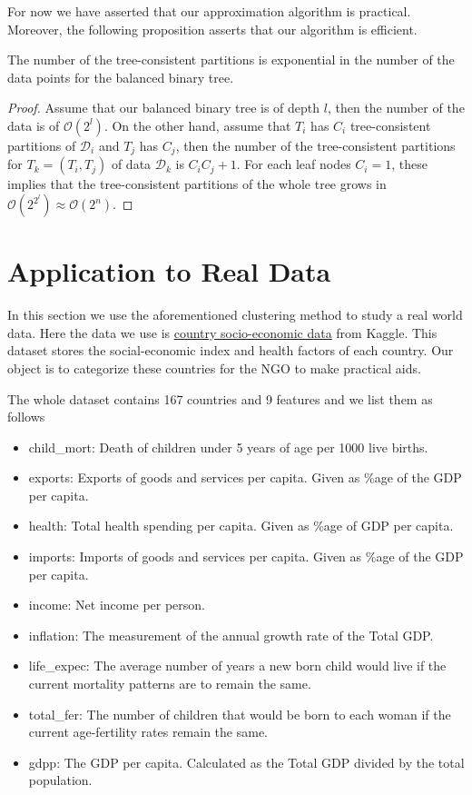 For now we have asserted that our approximation algorithm is practical. Moreover, the following proposition asserts that our algorithm is efficient.

\begin{proposition}
    The number of the tree-consistent partitions is exponential in the number of the data points for the balanced binary tree.
\end{proposition}

\begin{proof}
    Assume that our balanced binary tree is of depth $l$, then the number of the data is of $\mathcal{O}(2^l)$. On the other hand, assume that $T_i$ has $C_i$ tree-consistent partitions of $\mathcal{D}_i$ and $T_j$ has $C_j$, then the number of the tree-consistent partitions for $T_k=(T_i,T_j)$ of data $\mathcal{D}_k$ is $C_i C_j+1$. For each leaf nodes $C_i=1$, these implies that the tree-consistent partitions of the whole tree grows in $\mathcal{O}(2^{2^l})\approx \mathcal{O}(2^n)$.
\end{proof}
 
\section{Application to Real Data}

In this section we use the aforementioned clustering method to study a real world data. Here the data we use is \href{https://www.kaggle.com/rohan0301/unsupervised-learning-on-country-data}{country socio-economic data} from Kaggle. This dataset stores the social-economic index and health factors of each country. Our object is to categorize these countries for the NGO to make practical aids. 

The whole dataset contains 167 countries and 9 features and we list them as follows
\begin{itemize}
    \item child\_mort: Death of children under 5 years of age per 1000 live births.
    \item exports: Exports of goods and services per capita. Given as \%age of the GDP per capita.
    \item health: Total health spending per capita. Given as \%age of GDP per capita.
    \item imports: Imports of goods and services per capita. Given as \%age of the GDP per capita.
    \item income: Net income per person.
    \item inflation: The measurement of the annual growth rate of the Total GDP.
    \item life\_expec: The average number of years a new born child would live if the current mortality patterns are to remain the same.
    \item total\_fer: The number of children that would be born to each woman if the current age-fertility rates remain the same.
    \item gdpp: The GDP per capita. Calculated as the Total GDP divided by the total population.
\end{itemize}

